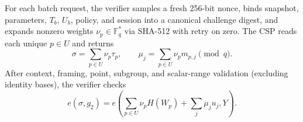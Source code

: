 \documentclass[10pt,journal]{IEEEtran}
\begin{document}
For each batch request, the verifier samples a fresh 256-bit nonce, binds snapshot, parameters, $T_b$, $U_b$, policy, and session into a canonical challenge digest, and expands nonzero weights $\nu_p\in\mathbb F_q^*$ via SHA-512 with retry on zero. The CSP reads each unique $p\in U$ and returns
\begin{equation}\label{eq:aggregate}
\sigma=\sum_{p\in U}\nu_p\tau_p,\qquad
\mu_j=\sum_{p\in U}\nu_pm_{p,j}\pmod q.
\end{equation}
After context, framing, point, subgroup, and scalar-range validation (excluding identity bases), the verifier checks
\begin{equation}\label{eq:pairing}
e(\sigma,g_2)=e\left(\sum_{p\in U}\nu_pH(W_p)+\sum_j\mu_ju_j,Y\right).
\end{equation}
\end{document}
